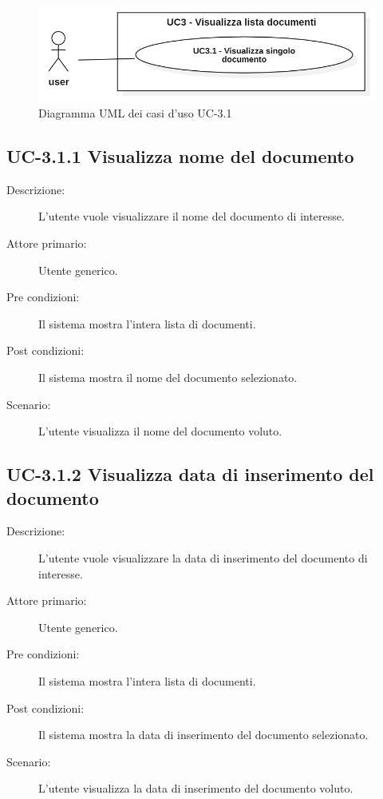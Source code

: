 \begin{figure}[H]
    \centering
    \includegraphics[width=0.8\linewidth]{UC3.1.PNG}
    \caption{Diagramma UML dei casi d'uso UC-3.1}
    \label{fig:UC3.1}
\end{figure}

\subsection{UC-3.1.1 Visualizza nome del documento}
\begin{description}
    \item[Descrizione:] L'utente vuole visualizzare il nome del documento di interesse.
    \item[Attore primario:] Utente generico.
    \item[Pre condizioni:] Il sistema mostra l’intera lista di documenti.
    \item[Post condizioni:] Il sistema mostra il nome del documento selezionato.
    \item[Scenario:] L'utente visualizza il nome del documento voluto.
\end{description}

\subsection{UC-3.1.2 Visualizza data di inserimento del documento}
\begin{description}
    \item[Descrizione:] L'utente vuole visualizzare la data di inserimento del documento di interesse.
    \item[Attore primario:] Utente generico.
    \item[Pre condizioni:] Il sistema mostra l’intera lista di documenti.
    \item[Post condizioni:] Il sistema mostra la data di inserimento del documento selezionato.
    \item[Scenario:] L'utente visualizza la data di inserimento del documento voluto.
\end{description}

